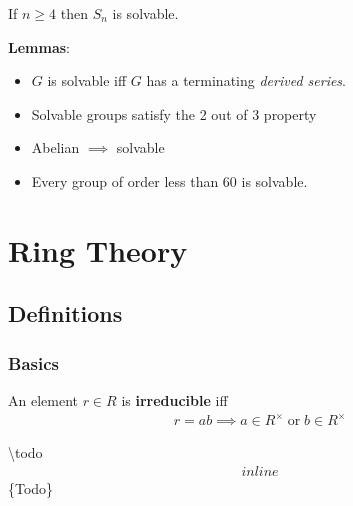 \begin{theorem}

If \(n\geq 4\) then \(S_n\) is solvable.

\end{theorem}

\textbf{Lemmas}:

\begin{itemize}
\tightlist
\item
  \(G\) is solvable iff \(G\) has a terminating \emph{derived series}.
\item
  Solvable groups satisfy the 2 out of 3 property
\item
  Abelian \(\implies\) solvable
\item
  Every group of order less than 60 is solvable.
\end{itemize}

\hypertarget{ring-theory}{%
\section{Ring Theory}\label{ring-theory}}

\hypertarget{definitions-1}{%
\subsection{Definitions}\label{definitions-1}}

\hypertarget{basics}{%
\subsubsection{Basics}\label{basics}}

\begin{definition}

An element \(r\in R\) is \textbf{irreducible} iff
\begin{align*}
r=ab \implies a \in R^{\times}{\operatorname{ {or} }} b\in R^{\times}
\end{align*}

\end{definition}

\begin{definition}

\textbackslash todo
\begin{align*}inline\end{align*}
\{Todo\}

\end{definition}

